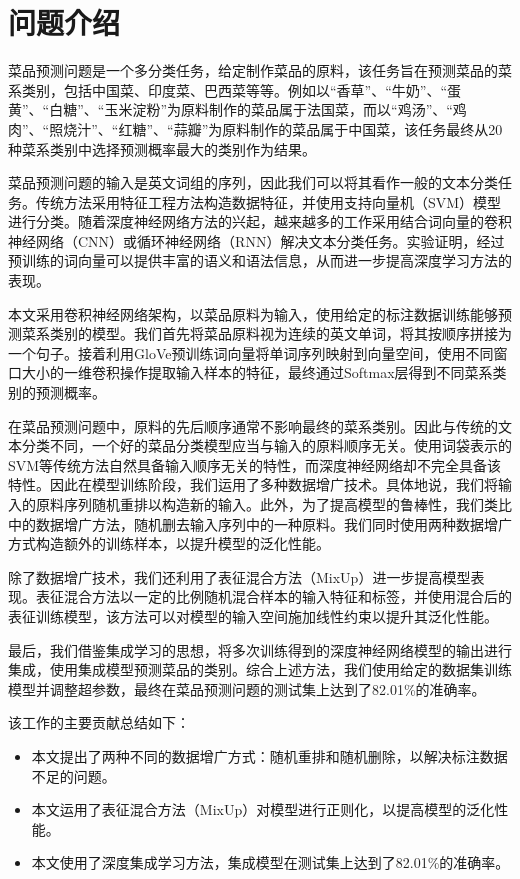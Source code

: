 \section{问题介绍}

菜品预测问题是一个多分类任务，给定制作菜品的原料，该任务旨在预测菜品的菜系类别，包括中国菜、印度菜、巴西菜等等。例如以``香草''、``牛奶''、``蛋黄''、``白糖''、``玉米淀粉''为原料制作的菜品属于法国菜，而以``鸡汤''、``鸡肉''、``照烧汁''、``红糖''、``蒜瓣''为原料制作的菜品属于中国菜，该任务最终从20种菜系类别中选择预测概率最大的类别作为结果。

菜品预测问题的输入是英文词组的序列，因此我们可以将其看作一般的文本分类任务。传统方法采用特征工程方法构造数据特征，并使用支持向量机（SVM）模型进行分类\cite{cortes1995support}。随着深度神经网络方法的兴起，越来越多的工作采用结合词向量\cite{mikolov2013distributed}的卷积神经网络（CNN）\cite{kim2014convolutional}或循环神经网络（RNN）\cite{chung2014empirical}解决文本分类任务。实验证明，经过预训练的词向量可以提供丰富的语义和语法信息\cite{mikolov2013distributed}，从而进一步提高深度学习方法的表现。

本文采用卷积神经网络架构，以菜品原料为输入，使用给定的标注数据训练能够预测菜系类别的模型。我们首先将菜品原料视为连续的英文单词，将其按顺序拼接为一个句子。接着利用GloVe预训练词向量\cite{pennington2014glove}将单词序列映射到向量空间，使用不同窗口大小的一维卷积操作提取输入样本的特征，最终通过Softmax层得到不同菜系类别的预测概率。

在菜品预测问题中，原料的先后顺序通常不影响最终的菜系类别。因此与传统的文本分类不同，一个好的菜品分类模型应当与输入的原料顺序无关。使用词袋表示的SVM等传统方法自然具备输入顺序无关的特性，而深度神经网络却不完全具备该特性。因此在模型训练阶段，我们运用了多种数据增广技术。具体地说，我们将输入的原料序列随机重排以构造新的输入。此外，为了提高模型的鲁棒性，我们类比\cite{wei2019eda}中的数据增广方法，随机删去输入序列中的一种原料。我们同时使用两种数据增广方式构造额外的训练样本，以提升模型的泛化性能。

除了数据增广技术，我们还利用了表征混合方法（MixUp）\cite{zhang2018mixup}进一步提高模型表现。表征混合方法以一定的比例随机混合样本的输入特征和标签，并使用混合后的表征训练模型，该方法可以对模型的输入空间施加线性约束以提升其泛化性能。

最后，我们借鉴集成学习的思想\cite{lakshminarayanan2017simple}，将多次训练得到的深度神经网络模型的输出进行集成，使用集成模型预测菜品的类别。综合上述方法，我们使用给定的数据集训练模型并调整超参数，最终在菜品预测问题的测试集上达到了82.01\%的准确率。

该工作的主要贡献总结如下：
\begin{itemize}
    \item 本文提出了两种不同的数据增广方式：随机重排和随机删除，以解决标注数据不足的问题。
    \item 本文运用了表征混合方法（MixUp）对模型进行正则化，以提高模型的泛化性能。
    \item 本文使用了深度集成学习方法，集成模型在测试集上达到了82.01\%的准确率。
\end{itemize}
